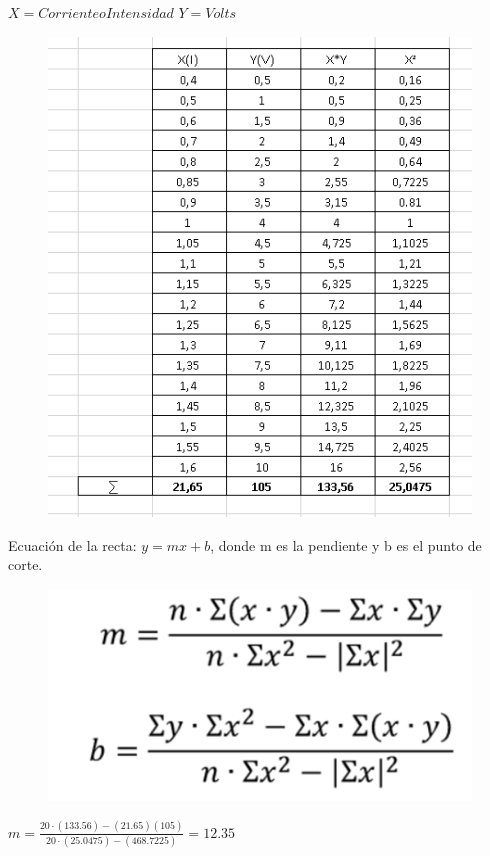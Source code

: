 \documentclass[10pt]{article}
\begin{document}
\begin{multicols}{2}
	$X = Corriente o Intensidad$	\hfill \break{}
	$Y = Volts$

	\begin{figure}[H]
		\includegraphics[scale = .5]{./Images/TablaMMC.PNG}
	\end{figure}

	Ecuación de la recta: $y = mx + b$, donde m es la pendiente y b es el punto
	de corte.

	\begin{figure}[H]
		\includegraphics[scale = .5]{./Images/MMC.png}
	\end{figure}

	$m = \frac{20 \cdot (133.56) - (21.65)(105)}{20 \cdot (25.0475) - (468.7225)} = 12.35$


\end{multicols}
\end{document}
